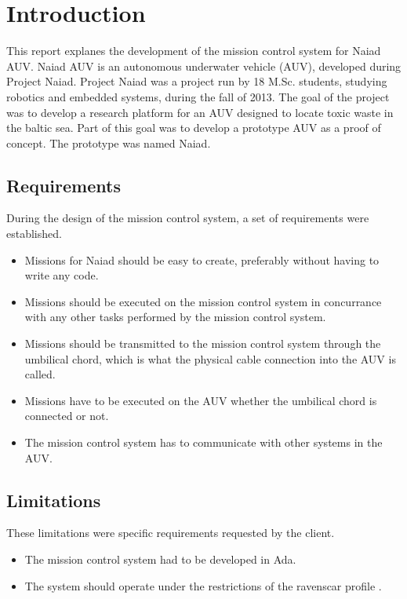 \section{Introduction}\label{sec:introduction}
This report explanes the development of the mission control system for Naiad AUV. Naiad AUV is an autonomous underwater vehicle (AUV), developed during Project Naiad. Project Naiad was a project run by 18 M.Sc. students, studying robotics and embedded systems, during the fall of 2013. The goal of the project was to develop a research platform for an AUV designed to locate toxic waste in the baltic sea. Part of this goal was to develop a prototype AUV as a proof of concept. The prototype was named Naiad.

\subsection{Requirements}
During the design of the mission control system, a set of requirements were established.
\begin{itemize}
\item Missions for Naiad should be easy to create, preferably without having to write any code.
\item Missions should be executed on the mission control system in concurrance with any other tasks performed by the mission control system.
\item Missions should be transmitted to the mission control system through the umbilical chord, which is what the physical cable connection into the AUV is called.
\item Missions have to be executed on the AUV whether the umbilical chord is connected or not.
\item The mission control system has to communicate with other systems in the AUV.
\end{itemize}

\subsection{Limitations}
These limitations were specific requirements requested by the client.
\begin{itemize}
\item The mission control system had to be developed in Ada\cite{web:mcsada}.
\item The system should operate under the restrictions of the ravenscar profile \cite{article:mcsraven}. 
\end{itemize}
